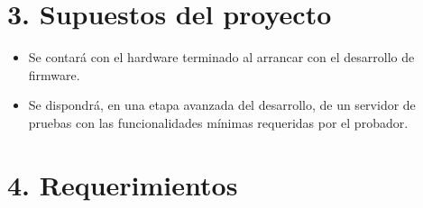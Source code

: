 \documentclass[11pt]{charter}
\begin{document}
\section{3. Supuestos del proyecto}
\label{sec:supuestos}

\begin{itemize}
\item Se contará con el hardware terminado al arrancar con el desarrollo de firmware.
\item Se dispondrá, en una etapa avanzada del desarrollo, de un servidor de pruebas con las funcionalidades mínimas requeridas por el probador.
\end{itemize}

\section{4. Requerimientos}
\label{sec:requerimientos}
\end{document}
